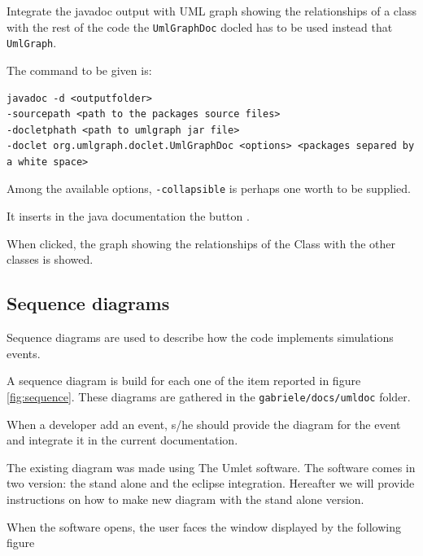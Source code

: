 \documentclass{book}
\begin{document}
Integrate the javadoc output with UML graph showing the relationships of a class with the rest of the code the \verb+UmlGraphDoc+ docled has to be used instead that \verb+UmlGraph+.

The command to be given is:

\begin{verbatim}
javadoc -d <outputfolder>
-sourcepath <path to the packages source files>
-docletphath <path to umlgraph jar file>
-doclet org.umlgraph.doclet.UmlGraphDoc <options> <packages separed by a white space>
\end{verbatim}

Among the available options, \verb+-collapsible+ is perhaps one worth to be supplied.

It inserts in the java documentation the button .

When clicked, the graph showing the relationships of the Class with the other classes is showed.  



\subsection{Sequence diagrams}

Sequence diagrams are used to describe how the code implements simulations events.

A sequence diagram is build for each one of the item reported in figure \ref{fig:sequence}. These diagrams are gathered in the \verb+gabriele/docs/umldoc+ folder.

When a developer add an event, s/he should provide the diagram for the event and integrate it in the current documentation.

The existing diagram was made using The Umlet software. 
The software comes in two version: the stand alone and the eclipse integration.
Hereafter we will provide instructions on how to make new diagram with the stand alone version.

When the software opens, the user faces the window displayed by the following figure
\end{document}
